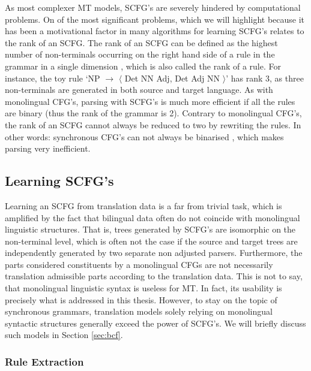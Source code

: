 As most complexer MT models, SCFG's are severely hindered by computational problems. On of the most significant problems, which we will highlight because it has been a motivational factor in many algorithms for learning SCFG's \citep[e.g.,]{zhang2006synchronous,zhang2008extracting,huang2009binarization} relates to the rank of an SCFG. The rank of an SCFG can be defined as the highest number of non-terminals occurring on the right hand side of a rule in the grammar in a single dimension \citep{gildea2006factoring}, which is also called the rank of a rule. For instance, the toy rule `NP $\rightarrow$ $\langle$ Det NN Adj, Det Adj NN $\rangle$' has rank 3, as three non-terminals are generated in both source and target language. As with monolingual CFG's, parsing with SCFG's is much more efficient if all the rules are binary (thus the rank of the grammar is 2). Contrary to monolingual CFG's, the rank of an SCFG cannot always be reduced to two by rewriting the rules. In other words: synchronous CFG's can not always be binarised \citep{huang2009binarization}, which makes parsing very inefficient.


\subsection{Learning SCFG's}
\label{subsec:learningSCFGs}

Learning an SCFG from translation data is a far from trivial task, which is amplified by the fact that bilingual data often do not coincide with monolingual linguistic structures. That is, trees generated by SCFG's are isomorphic on the non-terminal level, which is often not the case if the source and target trees are independently generated by two separate non adjusted parsers. Furthermore, the parts considered constituents by a monolingual CFGs are not necessarily translation admissible parts according to the translation data. This is not to say, that monolingual linguistic syntax is useless for MT. In fact, its usability is precisely what is addressed in this thesis. However, to stay on the topic of synchronous grammars, translation models solely relying on monolingual syntactic structures generally exceed the power of SCFG's. We will briefly discuss such models in Section \ref{sec:bcf}.

\subsubsection{Rule Extraction}

